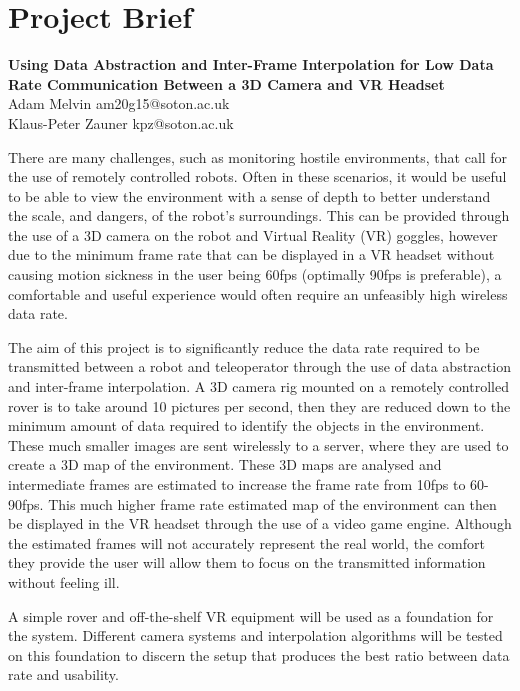 \chapter{Project Brief}
\label{appendix:brief}

\begin{center}
\textbf{Using Data Abstraction and Inter-Frame Interpolation for Low Data Rate Communication Between a 3D Camera and VR Headset} \\
Adam Melvin am20g15@soton.ac.uk \\
Klaus-Peter Zauner kpz@soton.ac.uk
\end{center}

There are many challenges, such as monitoring hostile environments, that call for the use of remotely controlled robots. Often in these scenarios, it would be useful to be able to view the environment with a sense of depth to better understand the scale, and dangers, of the robot’s surroundings. This can be provided through the use of a 3D camera on the robot and Virtual Reality (VR) goggles, however due to the minimum frame rate that can be displayed in a VR headset without causing motion sickness in the user being 60fps (optimally 90fps is preferable), a comfortable and useful experience would often require an unfeasibly high wireless data rate.

The aim of this project is to significantly reduce the data rate required to be transmitted between a robot and teleoperator through the use of data abstraction and inter-frame interpolation. A 3D camera rig mounted on a remotely controlled rover is to take around 10 pictures per second, then they are reduced down to the minimum amount of data required to identify the objects in the environment. These much smaller images are sent wirelessly to a server, where they are used to create a 3D map of the environment. These 3D maps are analysed and intermediate frames are estimated to increase the frame rate from 10fps to 60-90fps. This much higher frame rate estimated map of the environment can then be displayed in the VR headset through the use of a video game engine. Although the estimated frames will not accurately represent the real world, the comfort they provide the user will allow them to focus on the transmitted information without feeling ill.

A simple rover and off-the-shelf VR equipment will be used as a foundation for the system. Different camera systems and interpolation algorithms will be tested on this foundation to discern the setup that produces the best ratio between data rate and usability.
